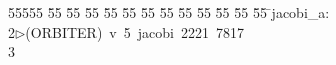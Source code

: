 %
%
\begin{tabbing}
55555 \= 55 \= 55 \= 55 \= 55 \= 55 \= 55 \= 55 \= 55 \= 55 \= 55 \= 55 \= 55 \= \>jacobi\_a:\\[0pt]
2\>$\triangleright$\>(ORBITER)\ v\ 5\ jacobi\ 2221\ 7817\\[0pt]
3\>\end{tabbing}
